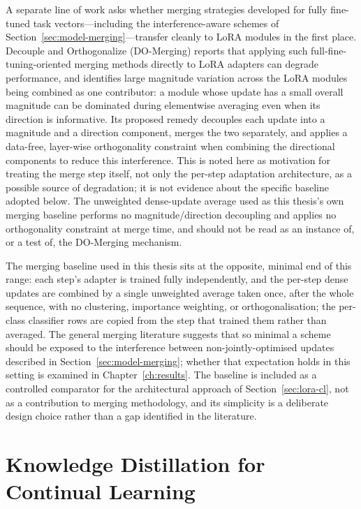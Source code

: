 A separate line of work asks whether merging strategies developed for fully
fine-tuned task vectors---including the interference-aware schemes of
Section~\ref{sec:model-merging}---transfer cleanly to LoRA modules in the
first place. Decouple and Orthogonalize (DO-Merging) \parencite{zheng2025domerging} reports that applying
such full-fine-tuning-oriented merging methods directly to LoRA adapters can
degrade performance, and identifies large magnitude variation across the
LoRA modules being combined as one contributor: a module whose update has a
small overall magnitude can be dominated during elementwise averaging even
when its direction is informative. Its proposed remedy decouples each
update into a magnitude and a direction component, merges the two
separately, and applies a data-free, layer-wise orthogonality constraint
when combining the directional components to reduce this interference. This
is noted here as motivation for treating the merge step itself, not only
the per-step adaptation architecture, as a possible source of degradation;
it is not evidence about the specific baseline adopted below. The
unweighted dense-update average used as this thesis's own merging baseline
performs no magnitude/direction decoupling and applies no orthogonality
constraint at merge time, and should not be read as an instance of, or a
test of, the DO-Merging mechanism.

The merging baseline used in this thesis sits at the opposite, minimal end
of this range: each step's adapter is trained fully independently, and the
per-step dense updates are combined by a single unweighted average taken
once, after the whole sequence, with no clustering, importance weighting,
or orthogonalisation; the per-class classifier rows are copied from the
step that trained them rather than averaged. The general merging literature
suggests that so minimal a scheme should be exposed to the interference
between non-jointly-optimised updates described in Section~\ref{sec:model-merging}; whether that
expectation holds in this setting is examined in Chapter~\ref{ch:results}. The baseline is
included as a controlled comparator for the architectural approach of
Section~\ref{sec:lora-cl}, not as a contribution to merging methodology, and its
simplicity is a deliberate design choice rather than a gap identified in
the literature.

\section{Knowledge Distillation for Continual Learning}
\label{sec:kd}


